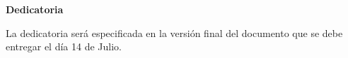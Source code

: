 
\newpage
\begin{center}
{\bf \Huge Dedicatoria}
\end{center}
\vspace{1cm}
\setlength{\baselineskip}{0.8cm}


La dedicatoria será especificada en la versión final del documento que se debe entregar el día 14 de Julio.